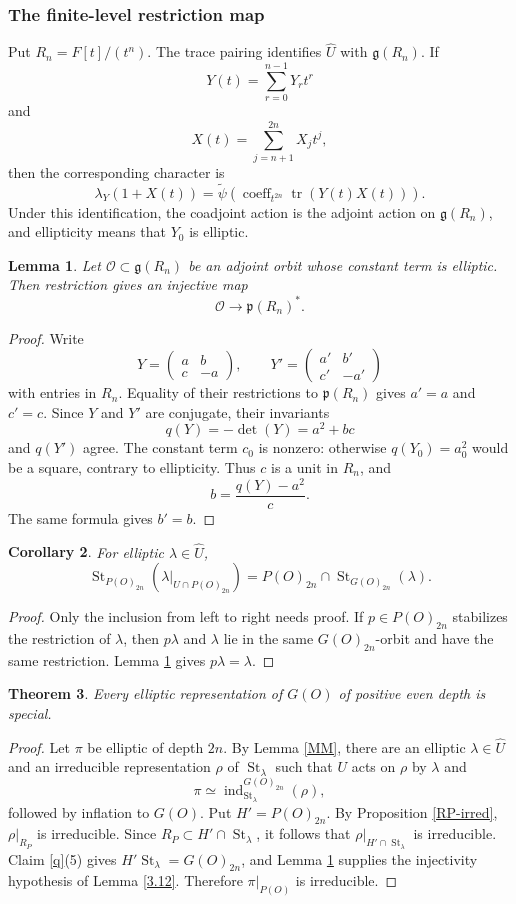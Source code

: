 \documentclass[11pt,a4paper,twoside]{amsart}
\newtheorem{theorem}{Theorem}[section]
\newtheorem{lemma}[theorem]{Lemma}
\newtheorem{corollary}[theorem]{Corollary}
\theoremstyle{definition}
\theoremstyle{remark}
\newcommand{\bl}{\lambda}
\newcommand{\mcO}{\mathcal O}
\newcommand{\fg}{\mathfrak g}
\newcommand{\ind}{\operatorname{ind}}
\newcommand{\St}{\operatorname{St}}
\begin{document}
\subsubsection{The finite-level restriction map}
Put $R_n=F[t]/(t^n)$. The trace pairing identifies $\widehat U$ with $\fg(R_n)$. If
$$
Y(t)=\sum_{r=0}^{n-1}Y_rt^r
$$
and
$$
X(t)=\sum_{j=n+1}^{2n}X_jt^j,
$$
then the corresponding character is
$$
\bl_Y(1+X(t))=
\widetilde\psi\left(\operatorname{coeff}_{t^{2n}}\operatorname{tr}(Y(t)X(t))\right).
$$
Under this identification, the coadjoint action is the adjoint action on $\fg(R_n)$, and ellipticity means that $Y_0$ is elliptic.
\begin{lemma}\label{orbit-restriction-injective}
Let $\mcO\subset\fg(R_n)$ be an adjoint orbit whose constant term is elliptic. Then restriction gives an injective map
$$
\mcO\longrightarrow\mathfrak p(R_n)^*.
$$
\end{lemma}
\begin{proof}
Write
$$
Y=\begin{pmatrix}a&b\\c&-a\end{pmatrix},
\qquad
Y'=\begin{pmatrix}a'&b'\\c'&-a'\end{pmatrix}
$$
with entries in $R_n$. Equality of their restrictions to $\mathfrak p(R_n)$ gives $a'=a$ and $c'=c$. Since $Y$ and $Y'$ are conjugate, their invariants
$$
q(Y)=-\det(Y)=a^2+bc
$$
and $q(Y')$ agree. The constant term $c_0$ is nonzero: otherwise $q(Y_0)=a_0^2$ would be a square, contrary to ellipticity. Thus $c$ is a unit in $R_n$, and
$$
b=\frac{q(Y)-a^2}{c}.
$$
The same formula gives $b'=b$.
\end{proof}
\begin{corollary}\label{finite-stabilizer-identity}
For elliptic $\bl\in\widehat U$,
$$
\St_{P(O)_{2n}}\left(\bl|_{U\cap P(O)_{2n}}\right)
=P(O)_{2n}\cap\St_{G(O)_{2n}}(\bl).
$$
\end{corollary}
\begin{proof}
Only the inclusion from left to right needs proof. If $p\in P(O)_{2n}$ stabilizes the restriction of $\bl$, then $p\bl$ and $\bl$ lie in the same $G(O)_{2n}$-orbit and have the same restriction. Lemma \ref{orbit-restriction-injective} gives $p\bl=\bl$.
\end{proof}
\begin{theorem}\label{charev}
Every elliptic representation of $G(O)$ of positive even depth is special.
\end{theorem}
\begin{proof}
Let $\pi$ be elliptic of depth $2n$. By Lemma \ref{MM}, there are an elliptic $\bl\in\widehat U$ and an irreducible representation $\rho$ of $\St_\bl$ such that $U$ acts on $\rho$ by $\bl$ and
$$
\pi\simeq\ind_{\St_\bl}^{G(O)_{2n}}(\rho),
$$
followed by inflation to $G(O)$. Put $H'=P(O)_{2n}$. By Proposition \ref{RP-irred}, $\rho|_{R_P}$ is irreducible. Since $R_P\subset H'\cap\St_\bl$, it follows that $\rho|_{H'\cap\St_\bl}$ is irreducible. Claim \ref{q}(5) gives $H'\St_\bl=G(O)_{2n}$, and Lemma \ref{orbit-restriction-injective} supplies the injectivity hypothesis of Lemma \ref{3.12}. Therefore $\pi|_{P(O)}$ is irreducible.
\end{proof}
\end{document}
